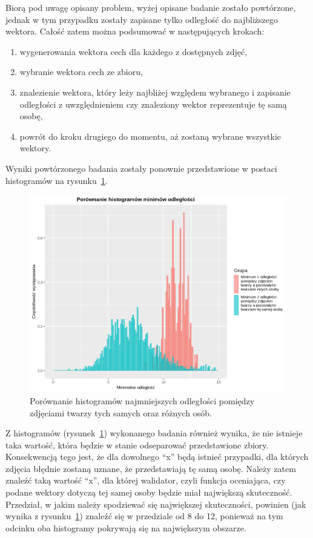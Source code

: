 \pagebreak

Biorą pod uwagę opisany problem, wyżej opisane badanie zostało powtórzone, jednak w tym przypadku
zostały zapisane tylko odległość do najbliższego wektora.
Całość zatem można podsumować w następujących krokach:
\begin{enumerate}
    \item wygenerowania wektora cech dla każdego z dostępnych zdjęć,
    \item wybranie wektora cech ze zbioru,
    \item znalezienie wektora, który leży najbliżej względem wybranego i zapisanie odległości
    z uwzględnieniem czy znaleziony wektor reprezentuje tę samą osobę,
    \item powrót do kroku drugiego do momentu, aż zostaną wybrane wszystkie wektory.
\end{enumerate}
Wyniki powtórzonego badania zostały ponownie przedstawione w postaci
histogramów na rysunku~\ref{fig:wykres_najmniejszych_odleglosc_wspolny}.

\begin{figure}[H]
    \centering
    \includegraphics[width=1\textwidth]{images/wykres_najmniejszych_odleglosc_wspolny}
    \caption{
        Porównanie histogramów najmniejszych odległości pomiędzy
        zdjęciami twarzy tych samych oraz różnych osób.
    }
    \customsource
    \label{fig:wykres_najmniejszych_odleglosc_wspolny}
\end{figure}

\pagebreak

Z histogramów (rysunek~\ref{fig:wykres_najmniejszych_odleglosc_wspolny}) wykonanego badania również wynika,
że nie istnieje taka wartość, która będzie w stanie odseparować przedstawione zbiory.
Konsekwencją tego jest, że dla dowolnego ``x'' będą istnieć przypadki, dla których
zdjęcia błędnie zostaną uznane, że przedstawiają tę samą osobę.
Należy zatem znaleźć taką wartość ``x'', dla której walidator, czyli funkcja oceniająca,
    czy podane wektory dotyczą tej samej osoby będzie miał największą skuteczność.
Przedział, w jakim należy spodziewać się największej skuteczności,
powinien (jak wynika z rysunku~\ref{fig:wykres_najmniejszych_odleglosc_wspolny})
znaleźć się w przedziale od \num{8} do \num{12}, ponieważ na tym odcinku
oba histogramy pokrywają się na największym obszarze.

